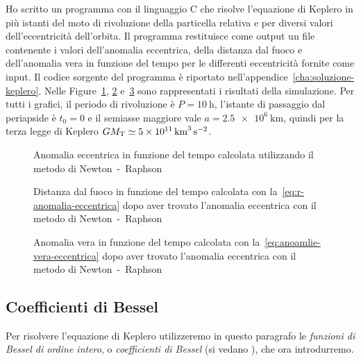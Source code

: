 Ho scritto un programma con il linguaggio C che risolve l'equazione di Keplero
in più istanti del moto di rivoluzione della particella relativa e per diversi
valori dell'eccentricità dell'orbita. Il programma restituisce come output un
file contenente i valori dell'anomalia eccentrica, della distanza dal fuoco e
dell'anomalia vera in funzione del tempo per le differenti eccentricità fornite
come input. Il codice sorgente del programma è riportato
nell'appendice~\ref{cha:soluzione-keplero}. Nelle
Figure~\ref{fig:newton-anomalia_eccentrica}, \ref{fig:newton-raggio}
e~\ref{fig:newton-anomalia_vera} sono rappresentati i risultati della
simulazione. Per tutti i grafici, il periodo di rivoluzione è
$P = \SI{10}{\hour}$, l'istante di passaggio dal periapside è $t_0 = 0$ e il
semiasse maggiore vale $a = \SI{2.5e6}{\kilo\metre}$, quindi per la terza legge
di Keplero $GM_\textup{T} \simeq
\SI{5e11}{\cubic\kilo\metre\per\square\second}$.
\begin{figure}
  \centering
  
  \caption[Anomalia eccentrica in funzione del tempo con il metodo di
  Newton]{Anomalia eccentrica in funzione del tempo calcolata
    utilizzando il metodo di Newton~-~Raphson}
  \label{fig:newton-anomalia_eccentrica}
\end{figure}
\begin{figure}
  \centering
  
  \caption[Distanza dal fuoco in funzione del tempo con il metodo di
  Newton]{Distanza dal fuoco in funzione del tempo calcolata con
    la~\eqref{eq:r-anomalia-eccentrica} dopo aver trovato l'anomalia eccentrica
    con il metodo di Newton~-~Raphson}
  \label{fig:newton-raggio}
\end{figure}
\begin{figure}
  \centering
  
  \caption[Anomalia vera in funzione del tempo con il metodo di
  Newton]{Anomalia vera in funzione del tempo calcolata con
    la~\eqref{eq:anoamlie-vera-eccentrica} dopo aver trovato l'anomalia
    eccentrica con il metodo di Newton~-~Raphson}
  \label{fig:newton-anomalia_vera}
\end{figure}

\subsection{Coefficienti di Bessel}
\label{sec:bessel}

Per risolvere l'equazione di Keplero utilizzeremo in questo paragrafo le
\emph{funzioni di Bessel di ordine intero}, o \emph{coefficienti di
  Bessel} (si vedano \textcites{abramowitz:handbook}{watson:bessel}%
{whittaker:modern-analysis}), che ora introdurremo.

